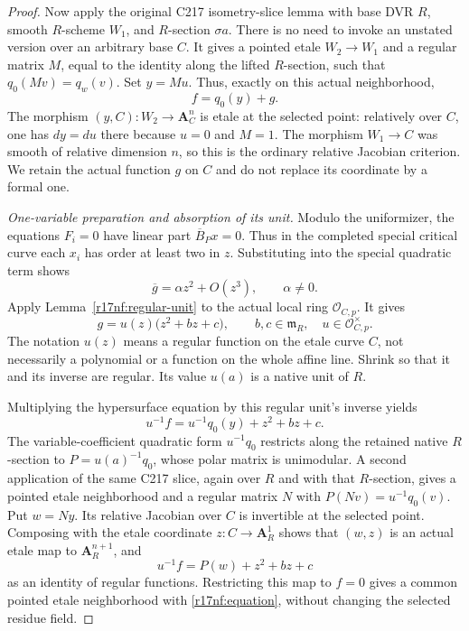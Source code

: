 \begin{proof}
Now apply the original C217 isometry-slice lemma with
base DVR $R$, smooth $R$-scheme $W_1$, and $R$-section
$\sigma a$. There is no need to invoke an unstated
version over an arbitrary base $C$. It gives a pointed
etale $W_2\to W_1$ and a regular matrix $M$, equal to
the identity along the lifted $R$-section, such that
$q_0(Mv)=q_w(v)$. Set $y=Mu$. Thus, exactly on this
actual neighborhood,
\[
                                f=q_0(y)+g.
 \tag{NF217.5}\label{r17nf:split-function}
\]
The morphism $(y,C):W_2\to\mathbf A^n_C$ is etale
at the selected point: relatively over $C$, one has
$dy=du$ there because $u=0$ and $M=1$.
The morphism $W_1\to C$ was smooth of relative dimension
$n$, so this is the ordinary relative Jacobian criterion.
We retain the actual function $g$ on $C$ and do not
replace its coordinate by a formal one.

\emph{One-variable preparation and absorption of its unit.}
Modulo the uniformizer, the equations $F_i=0$ have
linear part $\overline B_P x=0$. Thus in the completed
special critical curve each $x_i$ has order at least
two in $z$. Substituting into the special quadratic
term shows
\[
                            \overline g=\alpha z^2+O(z^3),
                                \qquad\alpha\ne0.
\]
Apply Lemma~\ref{r17nf:regular-unit} to the actual local
ring $\mathcal O_{C,p}$. It gives
\[
                  g=u(z)\bigl(z^2+bz+c\bigr),
       \qquad b,c\in\mathfrak m_R,\quad
                  u\in\mathcal O_{C,p}^{\times}.
 \tag{NF217.6}\label{r17nf:prepared}
\]
The notation $u(z)$ means a regular function on the
etale curve $C$, not necessarily a polynomial or a
function on the whole affine line. Shrink so that it
and its inverse are regular. Its value $u(a)$ is a
native unit of $R$.

Multiplying the hypersurface equation by this regular
unit's inverse yields
\[
                  u^{-1}f=u^{-1}q_0(y)+z^2+bz+c.
\]
The variable-coefficient quadratic form $u^{-1}q_0$
restricts along the retained native $R$-section to
$P=u(a)^{-1}q_0$, whose polar matrix is unimodular.
A second application of the same C217 slice, again
over $R$ and with that $R$-section, gives a pointed
etale neighborhood and a regular matrix $N$ with
$P(Nv)=u^{-1}q_0(v)$. Put $w=Ny$. Its relative
Jacobian over $C$ is invertible at the selected point.
Composing with the etale coordinate $z:C\to\mathbf A^1_R$
shows that $(w,z)$ is an actual etale map to
$\mathbf A^{n+1}_R$, and
\[
                          u^{-1}f=P(w)+z^2+bz+c
 \tag{NF217.7}\label{r17nf:exact-identity}
\]
as an identity of regular functions. Restricting this
map to $f=0$ gives a common pointed etale neighborhood
with \eqref{r17nf:equation}, without changing the
selected residue field.


\end{proof}
